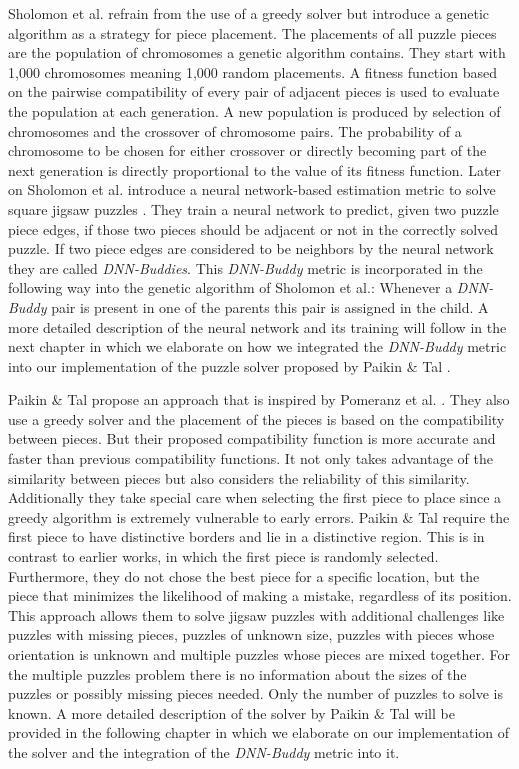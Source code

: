 \documentclass[11pt]{report}
\begin{document}
Sholomon et al. \cite{sholomon2013genetic} refrain from the use of a greedy
solver but introduce a genetic algorithm as a strategy for piece placement. The
placements of all puzzle pieces are the population of chromosomes a genetic
algorithm contains. They start with 1,000 chromosomes meaning 1,000 random
placements. A fitness function based on the pairwise compatibility of every pair
of adjacent pieces is used to evaluate the population at each generation. A new
population is produced by selection of chromosomes and the crossover of
chromosome pairs. The probability of a chromosome to be chosen for either
crossover or directly becoming part of the next generation is directly
proportional to the value of its fitness function. Later on Sholomon et al.
introduce a neural network-based estimation metric to solve square jigsaw
puzzles \cite{sholomon2016dnn}. They train a neural network to predict, given
two puzzle piece edges, if those two pieces should be adjacent or not in the
correctly solved puzzle. If two piece edges are considered to be neighbors by
the neural network they are called \textit{DNN-Buddies}. This \textit{DNN-Buddy}
metric is incorporated in the following way into the genetic algorithm of
Sholomon et al.: Whenever a \textit{DNN-Buddy} pair is present in one of the
parents this pair is assigned in the child. A more detailed description of the
neural network and its training will follow in the next chapter in which we
elaborate on how we integrated the \textit{DNN-Buddy} metric into our
implementation of the puzzle solver proposed by Paikin \& Tal \cite{Paikin2015}.

Paikin \& Tal \cite{Paikin2015} propose an approach that is inspired by Pomeranz
et al. \cite{Pomeranz2011}. They also use a greedy solver and the placement of
the pieces is based on the compatibility between pieces. But their proposed
compatibility function is more accurate and faster than previous compatibility
functions. It not only takes advantage of the similarity between pieces but also
considers the reliability of this similarity. Additionally they take special
care when selecting the first piece to place since a greedy algorithm is
extremely vulnerable to early errors. Paikin \& Tal require the first piece to
have distinctive borders and lie in a distinctive region. This is in contrast to
earlier works, in which the first piece is randomly selected. Furthermore, they
do not chose the best piece for a specific location, but the piece that
minimizes the likelihood of making a mistake, regardless of its position. This
approach allows them to solve jigsaw puzzles with additional challenges like
puzzles with missing pieces, puzzles of unknown size, puzzles with pieces whose
orientation is unknown and multiple puzzles whose pieces are mixed together. For
the multiple puzzles problem there is no information about the sizes of the
puzzles or possibly missing pieces needed. Only the number of puzzles to solve
is known. A more detailed description of the solver by Paikin \& Tal will be
provided in the following chapter in which we elaborate on our implementation of
the solver and the integration of the \textit{DNN-Buddy} metric into it.
\end{document}
